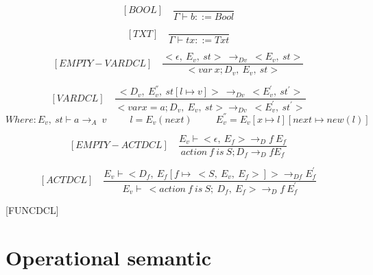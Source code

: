 	\[
	[BOOL] \quad
	\dfrac{}{\Gamma \vdash b ::= Bool}
	\]
	
  	\[
  	[TXT] \quad
  	\dfrac{}{\Gamma \vdash tx ::= Txt}
  	\]
  
	\[
  	[EMPTY-VARDCL] \quad
  	\dfrac{<\epsilon, \ E_v, \ st> \ \rightarrow_{Dv} \ <E_v, \ st> }{<var \ x; D_v,\ E_v,\ st>}
  	\]
  	
  	\[
  	[VARDCL] \quad
  	\dfrac{<D_v, \ E_v^{''}, \ st[l \mapsto v]> \ \rightarrow_{Dv} \ <E_v^{'}, \ st^{'}> }{<var x = a; D_v,\ E_v,\ st> \rightarrow_{Dv} \ <E_v^{'}, \ st^{'}>}
  	\]
  	\begin{math}
	  	Where: E_v, \ st \vdash a \rightarrow_A \ v
	  	\qquad \ \ l = E_v(next)
	  	\qquad \ \ E_v^{''} = E_v[x \mapsto l][next \mapsto new(l)]
  	\end{math}
  	
  	\[
  	[EMPTY-ACTDCL] \quad
  	\dfrac{E_v \vdash <\epsilon, \ E_f> \rightarrow_Df \ E_f}{ action \ f \ is \ S; D_f \rightarrow_Df E_f }
  	\]
  	
  	
	\[
  	[ACTDCL] \quad
  	\dfrac{E_v \vdash <D_f, \ E_f[f \mapsto \ <S, \ E_v, \ E_f>]> \rightarrow_{Df} E^{'}_f}{E_v \vdash \ <action \ f \ is \ S; \ D_f, \ E_f> \rightarrow_Df \ E_f^{'}}
  	\]
  

  	


    [FUNCDCL]

  
  \section{Operational semantic}